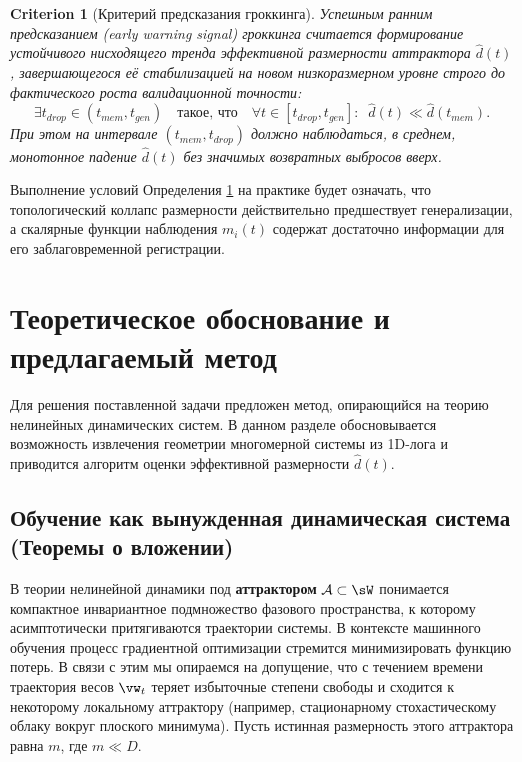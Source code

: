 \documentclass{article}
\newtheorem{criterion}{Criterion}
\begin{document}
\begin{criterion}[Критерий предсказания гроккинга]\label{def:criterion}
Успешным ранним предсказанием (early warning signal) гроккинга считается формирование устойчивого нисходящего тренда эффективной размерности аттрактора $\hat{d}(t)$, завершающегося её стабилизацией на новом низкоразмерном уровне строго до фактического роста валидационной точности:
\begin{equation}
    \exists t_{drop} \in (t_{mem}, t_{gen}) \quad \text{такое, что} \quad \forall t \in [t_{drop}, t_{gen}]: \;\; \hat{d}(t) \ll \hat{d}(t_{mem}).
\end{equation}
При этом на интервале $(t_{mem}, t_{drop})$ должно наблюдаться, в среднем, монотонное падение $\hat{d}(t)$ без значимых возвратных выбросов вверх.
\end{criterion}

Выполнение условий Определения \ref{def:criterion} на практике будет означать, что топологический коллапс размерности действительно предшествует генерализации, а скалярные функции наблюдения $m_i(t)$ содержат достаточно информации для его заблаговременной регистрации.










\section{Теоретическое обоснование и предлагаемый метод}\label{sec:method}

Для решения поставленной задачи предложен метод, опирающийся на теорию нелинейных динамических систем. В данном разделе обосновывается возможность извлечения геометрии многомерной системы из 1D-лога и приводится алгоритм оценки эффективной размерности $\hat{d}(t)$.

\subsection{Обучение как вынужденная динамическая система (Теоремы о вложении)}

В теории нелинейной динамики под \textbf{аттрактором} $\mathcal{A} \subset \sW$ понимается компактное инвариантное подмножество фазового пространства, к которому асимптотически притягиваются траектории системы. В контексте машинного обучения процесс градиентной оптимизации стремится минимизировать функцию потерь. В связи с этим мы опираемся на допущение, что с течением времени траектория весов $\vw_t$ теряет избыточные степени свободы и сходится к некоторому локальному аттрактору (например, стационарному стохастическому облаку вокруг плоского минимума). Пусть истинная размерность этого аттрактора равна $m$, где $m \ll D$.
\end{document}
